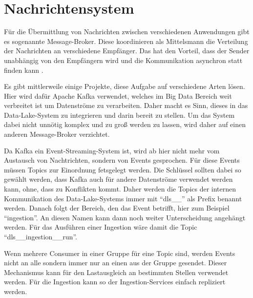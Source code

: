 \section{Nachrichtensystem}

Für die Übermittlung von Nachrichten zwischen verschiedenen Anwendungen gibt es sogenannte Message-Broker.
Diese koordinieren als Mittelsmann die Verteilung der Nachrichten an verschiedene Empfänger.
Das hat den Vorteil, dass der Sender unabhängig von den Empfängern wird und die Kommunikation asynchron statt finden kann \parencite{message-broker}.

Es gibt mittlerweile einige Projekte, diese Aufgabe auf verschiedene Arten lösen.
Hier wird dafür Apache Kafka verwendet, welches im Big Data Bereich weit verbreitet ist um Datenströme zu verarbeiten.
Daher macht es Sinn, dieses in das Data-Lake-System zu integrieren und darin bereit zu stellen.
Um das System dabei nicht unnötig komplex und zu groß werden zu lassen, wird daher auf einen anderen Message-Broker verzichtet.

Da Kafka ein Event-Streaming-System ist, wird ab hier nicht mehr vom Austausch von Nachtrichten, sondern von Events gesprochen.
Für diese Events müssen Topics zur Einordnung fetsgelegt werden.
Die Schlüssel sollten dabei so gewählt werden, dass Kafka auch für andere Datenströme verwendet werden kann, ohne, dass zu Konflikten kommt.
Daher werden die Topics der internen Kommunikation des Data-Lake-Systems immer mit "`dls\_\_"' als Prefix benannt werden.
Danach folgt der Bereich, den das Event betrifft, hier zum Beispiel "`ingestion"'.
An diesen Namen kann dann noch weiter Unterscheidung angehängt werden.
Für das Ausführen einer Ingestion wäre damit die Topic "`dls\_\_ingestion\_\_run"'.

Wenn mehrere Consumer in einer Gruppe für eine Topic sind, werden Events nicht an alle sondern immer nur an einen aus der Gruppe gesendet.
Dieser Mechanismus kann für den Lastausgleich an bestimmten Stellen verwendet werden.
Für die Ingestion kann so der Ingestion-Services einfach repliziert werden.